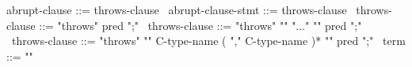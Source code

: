 \begin{syntax}
  abrupt-clause ::= throws-clause
  \
  abrupt-clause-stmt ::= throws-clause
  \
  throws-clause ::= "throws" pred ";"
  \
  throws-clause ::= "throws" "{" "..." "}" pred ";"
  \
  throws-clause ::= "throws" "{" C-type-name ( "," C-type-name )* "}" pred ";"
  \
  term  ::= "\exception"
\end{syntax}
